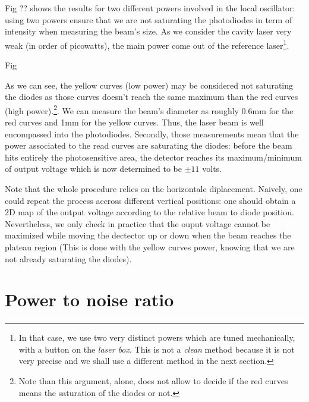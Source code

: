 \documentclass[12pt]{report}
\begin{document}
Fig ?? shows the results for two different powers involved in the local oscillator: using two powers ensure that we are not saturating the photodiodes in term of intensity when measuring the beam's size. As we consider the cavity laser very weak (in order of picowatts), the main power come out of the reference laser\footnote{In that case, we use two very distinct powers which are tuned mechanically, with a button on the \textit{laser box}. This is not a \textit{clean} method because it is not very precise and we shall use a different method in the next section.}.

Fig

As we can see, the yellow curves (low power) may be considered not saturating the diodes as those curves doesn't reach the same maximum than the red curves (high power).\footnote{Note than this argument, alone, does not allow to decide if the red curves means the saturation of the diodes or not.}. We can measure the beam's diameter as roughly 0.6mm for the red curves and 1mm for the yellow curves. Thus, the laser beam is well encompassed into the photodiodes. Secondly, those measurements mean that the power associated to the read curves are saturating the diodes: before the beam hits entirely the photosensitive area, the detector reaches its maximum/minimum of output voltage which is now determined to be $\pm11$ volts.

Note that the whole procedure relies on the horizontale diplacement. Naively, one could repeat the process accross different vertical positions: one should obtain a 2D map of the output voltage according to the relative beam to diode position. Nevertheless, we only check in practice that the ouput voltage cannot be maximized while moving the dectector up or down when the beam reaches the plateau region (This is done with the yellow curves power, knowing that we are not already saturating the diodes).

\section{Power to noise ratio}
\paragraph{}
\end{document}
